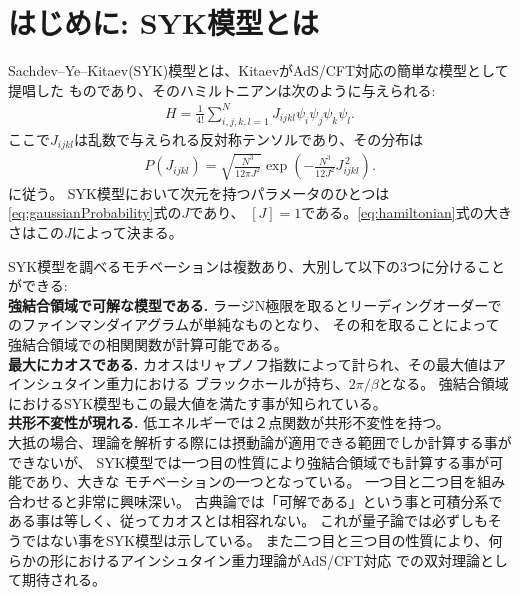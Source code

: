 \section{はじめに: SYK模型とは}
Sachdev--Ye--Kitaev(SYK)模型とは、KitaevがAdS/CFT対応の簡単な模型として提唱した
ものであり、そのハミルトニアンは次のように与えられる:
\begin{align}
  H = \frac{1}{4!}\sum_{i,j,k,l = 1}^{N} J_{ijkl}\psi_i\psi_j\psi_k\psi_l.
  \label{eq:hamiltonian}
\end{align}
ここで$J_{ijkl}$は乱数で与えられる反対称テンソルであり、その分布は
\begin{align}
  P(J_{ijkl}) = \sqrt{\frac{N^3}{12\pi J^2}}
                \exp\left(-\frac{N^3}{12J^2}J_{ijkl}^{\, 2}\right).
	\label{eq:gaussianProbability}
\end{align}
に従う。
SYK模型において次元を持つパラメータのひとつは\eqref{eq:gaussianProbability}式の$J$であり、
$[J] = 1$である。\eqref{eq:hamiltonian}式の大きさはこの$J$によって決まる。

SYK模型を調べるモチベーションは複数あり、大別して以下の3つに分けることができる:\\

\textbf{強結合領域で可解な模型である.}
ラージN極限を取るとリーディングオーダーでのファインマンダイアグラムが単純なものとなり、
その和を取ることによって強結合領域での相関関数が計算可能である。\\

\textbf{最大にカオスである.}
カオスはリャプノフ指数によって計られ、その最大値はアインシュタイン重力における
ブラックホールが持ち、$2\pi / \beta$となる\cite{shenker}。
強結合領域におけるSYK模型もこの最大値を満たす事が知られている\cite{maldacena}。\\

\textbf{共形不変性が現れる.}
低エネルギーでは２点関数が共形不変性を持つ。\\

大抵の場合、理論を解析する際には摂動論が適用できる範囲でしか計算する事ができないが、
SYK模型では一つ目の性質により強結合領域でも計算する事が可能であり、大きな
モチベーションの一つとなっている。
一つ目と二つ目を組み合わせると非常に興味深い。
古典論では「可解である」という事と可積分系である事は等しく、従ってカオスとは相容れない\cite{polchinski}。
これが量子論では必ずしもそうではない事をSYK模型は示している。
また二つ目と三つ目の性質により、何らかの形におけるアインシュタイン重力理論がAdS/CFT対応
での双対理論として期待される。


\pagebreak
